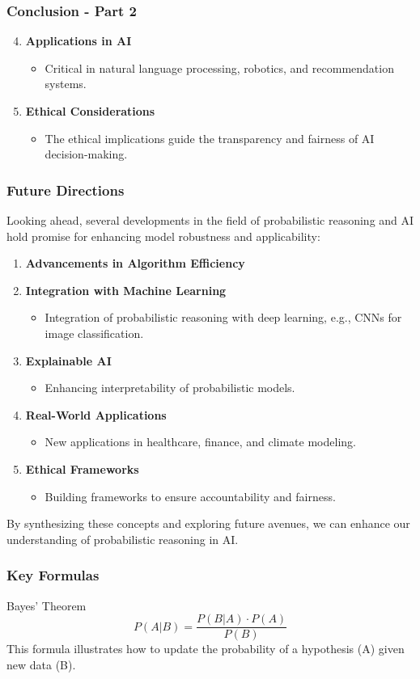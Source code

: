 \documentclass[aspectratio=169]{beamer}
\begin{document}
\begin{frame}[fragile]
  \frametitle{Conclusion - Part 2}
  \begin{enumerate}
    \setcounter{enumii}{3}
    \item \textbf{Applications in AI}
      \begin{itemize}
        \item Critical in natural language processing, robotics, and recommendation systems.
      \end{itemize}
    \item \textbf{Ethical Considerations}
      \begin{itemize}
        \item The ethical implications guide the transparency and fairness of AI decision-making.
      \end{itemize}
  \end{enumerate}
\end{frame}

\begin{frame}[fragile]
  \frametitle{Future Directions}
  Looking ahead, several developments in the field of probabilistic reasoning and AI hold promise for enhancing model robustness and applicability:

  \begin{enumerate}
    \item \textbf{Advancements in Algorithm Efficiency}
    \item \textbf{Integration with Machine Learning}
      \begin{itemize}
        \item Integration of probabilistic reasoning with deep learning, e.g., CNNs for image classification.
      \end{itemize}
    \item \textbf{Explainable AI}
      \begin{itemize}
        \item Enhancing interpretability of probabilistic models.
      \end{itemize}
    \item \textbf{Real-World Applications}
      \begin{itemize}
        \item New applications in healthcare, finance, and climate modeling.
      \end{itemize}
    \item \textbf{Ethical Frameworks}
      \begin{itemize}
        \item Building frameworks to ensure accountability and fairness.
      \end{itemize}
  \end{enumerate}
  
  By synthesizing these concepts and exploring future avenues, we can enhance our understanding of probabilistic reasoning in AI.
\end{frame}

\begin{frame}[fragile]
  \frametitle{Key Formulas}
  \begin{block}{Bayes' Theorem}
    \[
    P(A|B) = \frac{P(B|A) \cdot P(A)}{P(B)}
    \]
    This formula illustrates how to update the probability of a hypothesis (A) given new data (B).
  \end{block}
\end{frame}
\end{document}
